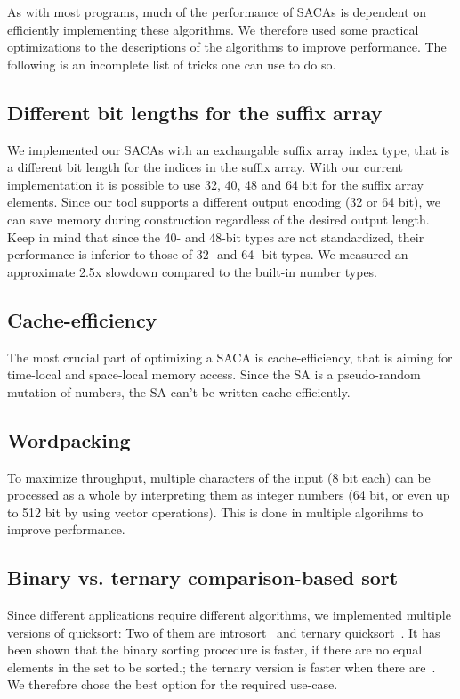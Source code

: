 As with most programs, much of the performance of SACAs is dependent on efficiently implementing these algorithms.
We therefore used some practical optimizations to the descriptions of the algorithms to improve performance.
The following is an incomplete list of tricks one can use to do so.

\subsection{Different bit lengths for the suffix array}

We implemented our SACAs with an exchangable suffix array index type, that is a different bit length for the indices in the suffix array.
With our current implementation it is possible to use 32, 40, 48 and 64 bit for the suffix array elements.
Since our tool supports a different output encoding (32 or 64 bit), we can save memory during construction regardless of the desired output length.
Keep in mind that since the 40- and 48-bit types are not standardized, their performance is inferior to those of 32- and 64- bit types.
We measured an approximate 2.5x slowdown compared to the built-in number types.

\subsection{Cache-efficiency}

The most crucial part of optimizing a SACA is cache-efficiency, that is aiming for time-local and space-local memory access.
Since the SA is a pseudo-random mutation of numbers, the SA can't be written cache-efficiently.

\subsection{Wordpacking}

To maximize throughput, multiple characters of the input (8 bit each) can be processed as a whole by
interpreting them as integer numbers (64 bit, or even up to 512 bit by using vector operations).
This is done in multiple algorihms to improve performance.

\subsection{Binary vs. ternary comparison-based sort}

Since different applications require different algorithms, we implemented multiple versions of quicksort:
Two of them are introsort~\cite{Musser97} and ternary quicksort~\cite{ternary_quicksort}.
It has been shown that the binary sorting procedure is faster,
if there are no equal elements in the set to be sorted.;
the ternary version is faster when there are~\cite{ternary_quicksort}.
We therefore chose the best option for the required use-case.

